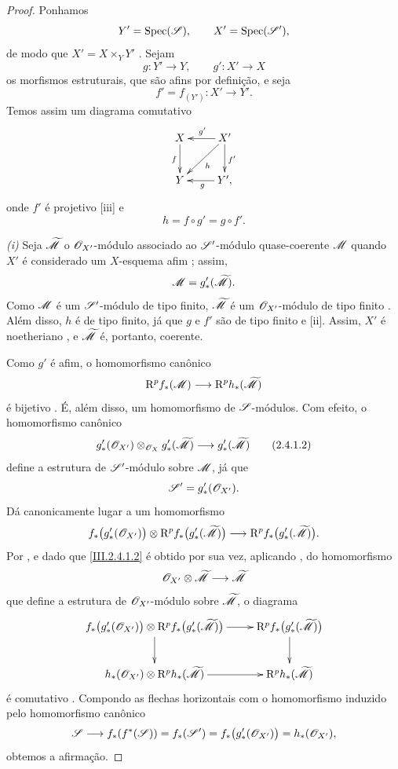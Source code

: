 \begin{proof}
Ponhamos
\[
  Y'=\operatorname{Spec}(\mathscr{S}),\qquad X'=\operatorname{Spec}(\mathscr{S}'),
\]
de modo que $X'=X\times_Y Y'$ .
Sejam
\[
  g:Y'\longrightarrow Y,\qquad g':X'\longrightarrow X
\]
os morfismos estruturais, que são afins por definição, e seja
\[
  f'=f_{(Y')}:X'\longrightarrow Y'.
\]
Temos assim um diagrama comutativo
\[
  \xymatrix{
    X\ar[d]_f &
    X'\ar[l]_{g'}\ar[d]^{f'}\ar[dl]^{h}\\
    Y &
    Y'\ar[l]^{g},
  }
\]
onde $f'$ é projetivo [iii] e
\[
  h=f\circ g'=g\circ f'.
\]

\emph{(i) } Seja $\widetilde{\mathscr{M}}$ o $\mathscr{O}_{X'}$-módulo associado ao $\mathscr{S}'$-módulo quase-coerente $\mathscr{M}$ quando $X'$ é considerado um $X$-esquema afim ; assim,
\[
  \mathscr{M}=g'_*(\widetilde{\mathscr{M}}).
\]
Como $\mathscr{M}$ é um $\mathscr{S}'$-módulo de tipo finito, $\widetilde{\mathscr{M}}$ é um $\mathscr{O}_{X'}$-módulo de tipo finito .
Além disso, $h$ é de tipo finito, já que $g$ e $f'$ são de tipo finito  e [ii].
Assim, $X'$ é noetheriano , e $\widetilde{\mathscr{M}}$ é, portanto, coerente.

Como $g'$ é afim, o homomorfismo canônico
\[
  \mathrm{R}^p f_*(\mathscr{M})
  \longrightarrow
  \mathrm{R}^p h_*(\widetilde{\mathscr{M}})
\]
é bijetivo .
É, além disso, um homomorfismo de $\mathscr{S}$-módulos.
Com efeito, o homomorfismo canônico
\[
\label{III.2.4.1.2}
  g'_*(\sh{O}_{X'})
  \otimes_{\sh{O}_X}
  g'_*(\widetilde{\sh{M}})
  \longrightarrow
  g'_*(\widetilde{\sh{M}})
  \tag{2.4.1.2}
\]
define a estrutura de $\mathscr{S}'$-módulo sobre $\mathscr{M}$, já que
\[
  \mathscr{S}'=g'_*(\mathscr{O}_{X'}).
\]
Dá canonicamente lugar a um homomorfismo
\[
  f_*\bigl(g'_*(\mathscr{O}_{X'})\bigr)
  \otimes
  \mathrm{R}^p f_*\bigl(g'_*(\widetilde{\mathscr{M}})\bigr)
  \longrightarrow
  \mathrm{R}^p f_*\bigl(g'_*(\widetilde{\mathscr{M}})\bigr).
\]
Por , e dado que \eqref{III.2.4.1.2} é obtido por sua vez, aplicando , do homomorfismo
\[
  \mathscr{O}_{X'}\otimes\widetilde{\mathscr{M}}
  \longrightarrow\widetilde{\mathscr{M}}
\]
que define a estrutura de $\mathscr{O}_{X'}$-módulo sobre $\widetilde{\mathscr{M}}$, o diagrama
\[
  \xymatrix{
    f_*\bigl(g'_*(\sh{O}_{X'})\bigr)
    \otimes\RR^p f_*\bigl(g'_*(\widetilde{\sh{M}})\bigr)
    \ar[r]\ar[d] &
    \RR^p f_*\bigl(g'_*(\widetilde{\sh{M}})\bigr)\ar[d]\\
    h_*(\sh{O}_{X'})
    \otimes\RR^p h_*(\widetilde{\sh{M}})
    \ar[r] &
    \RR^p h_*(\widetilde{\sh{M}})
  }
\]
é comutativo .
Compondo as flechas horizontais com o homomorfismo induzido pelo homomorfismo canônico
\[
  \mathscr{S}
  \longrightarrow f_*(f^*(\mathscr{S}))
  =f_*(\mathscr{S}')
  =f_*\bigl(g'_*(\mathscr{O}_{X'})\bigr)
  =h_*(\mathscr{O}_{X'}),
\]
obtemos a afirmação.


\end{proof}
